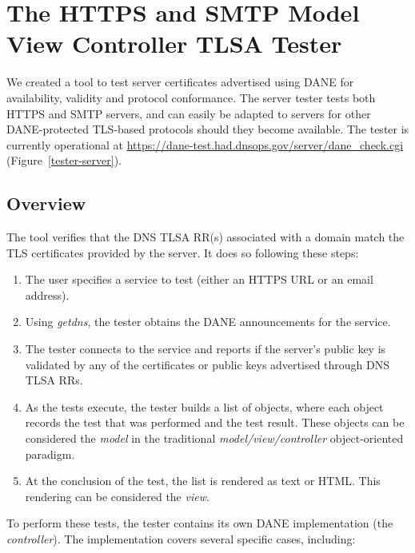 \documentclass[preprint,3p,11pt]{elsarticle}
\begin{document}
\section{The HTTPS and SMTP Model View Controller TLSA Tester}
We created a tool to test server certificates advertised using DANE
for availability, validity and protocol conformance. The server tester
tests both HTTPS and SMTP servers, and can easily be adapted to servers
for other DANE-protected TLS-based protocols should they become available. The tester
is currently operational at
\url{https://dane-test.had.dnsops.gov/server/dane_check.cgi} (Figure~\ref{tester-server}).


\subsection{Overview}

The tool verifies that the DNS TLSA RR(s) associated with a domain
match the TLS certificates provided by the server. It does so following these steps: 

\begin{enumerate}
\item The user specifies a service to test (either an HTTPS URL or an
  email address).
\item Using \emph{getdns}, the tester obtains the DANE announcements for the
  service. 
\item The tester connects to the service and reports if the server's
  public key is validated by any of the   certificates or public keys
  advertised through DNS TLSA RRs. 
\item As the tests execute, the tester builds a list of objects, where
  each object records the test that was performed and the test
  result. These objects can be considered the \emph{model} in the
  traditional \emph{model/view/controller} object-oriented paradigm.
\item At the conclusion of the test, the list is rendered as text or
  HTML. This rendering can be considered the \emph{view}.
\end{enumerate}

To perform these tests, the tester contains its own DANE
implementation (the \emph{controller}). The implementation covers several specific cases,
including:
\end{document}
